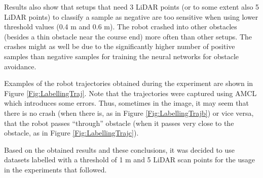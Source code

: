 Results also show that setups that need 3 LiDAR points (or to some extent also 5 LiDAR points) to classify a sample as negative are too sensitive when using lower threshold values (0.4 m and 0.6 m). The robot crashed into other obstacles (besides a thin obstacle near the course end) more often than other setups. The crashes might as well be due to the significantly higher number of positive samples than negative samples for training the neural networks for obstacle avoidance.

Examples of the robot trajectories obtained during the experiment are shown in Figure \ref{Fig:LabellingTraj}. Note that the trajectories were captured using AMCL \cite{Fox1997,Thrun2006} which introduces some errors. Thus, sometimes in the image, it may seem that there is no crash (when there is, as in Figure \ref{Fig:LabellingTrajb}) or vice versa, that the robot passes ``through'' obstacle (when it passes very close to the obstacle, as in Figure \ref{Fig:LabellingTrajc}).

Based on the obtained results and these conclusions, it was decided to use datasets labelled with a threshold of 1 m and 5 LiDAR scan points for the usage in the experiments that followed.

